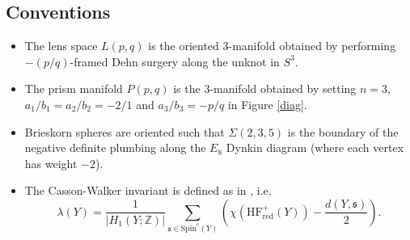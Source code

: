 \documentclass[12pt]{amsart}
\theoremstyle{definition}
\theoremstyle{remark}
\numberwithin{equation}{section}
\begin{document}
\subsection*{Conventions}
\begin{itemize}
\item The lens space $L(p,q)$ is the oriented $3$-manifold obtained by performing $-(p/q)$-framed Dehn surgery along the unknot in $S^{3}$.
\item The prism manifold $P(p,q)$ is the $3$-manifold obtained by setting $n=3$, $a_{1}/b_{1}=a_{2}/b_{2}=-2/1$ and $a_{3}/b_{3}=-p/q$ in Figure \ref{diag}.
\item Brieskorn spheres are oriented such that $\Sigma(2,3,5)$ is the boundary of the negative definite plumbing along the $E_{8}$ Dynkin diagram (where each vertex has weight $-2$).
\item The Casson-Walker invariant is defined as in \cite{Rustamov}, i.e. \[\lambda(Y)=\frac{1}{|H_{1}(Y;\mathbb{Z})|}\sum_{\mathfrak{s}\in\mathrm{Spin}^{c}(Y)}\left(\chi(\mathrm{HF}^{+}_{\mathrm{red}}(Y))-\frac{d(Y,\mathfrak{s})}{2}\right).\]
\end{itemize}




\end{document}

